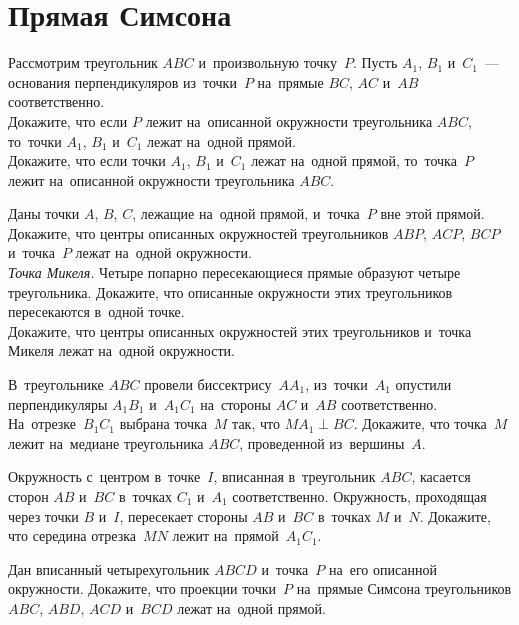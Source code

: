

\section*{Прямая Симсона}


\begin{problems}

\item
Рассмотрим треугольник $ABC$ и~произвольную точку~$P$.
Пусть $A_1$, $B_1$ и~$C_1$~--- основания перпендикуляров из~точки~$P$ на~прямые
$BC$, $AC$ и~$AB$ соответственно.
\\
\sbp
Докажите, что если $P$ лежит на~описанной окружности треугольника $ABC$,
то~точки $A_1$, $B_1$ и~$C_1$ лежат на~одной прямой.
\\
\sbp
Докажите, что если точки $A_1$, $B_1$ и~$C_1$ лежат на~одной прямой,
то~точка~$P$ лежит на~описанной окружности треугольника $ABC$.

\item
\sbp
Даны точки $A$, $B$, $C$, лежащие на~одной прямой, и~точка~$P$ вне этой прямой.
Докажите, что центры описанных окружностей треугольников $ABP$, $ACP$, $BCP$
и~точка~$P$ лежат на~одной окружности.
\\
\sbp\emph{Точка Микеля.}
Четыре попарно пересекающиеся прямые образуют четыре треугольника.
Докажите, что описанные окружности этих треугольников пересекаются в~одной
точке.
\\
\sbp
Докажите, что центры описанных окружностей этих треугольников и~точка Микеля
лежат на~одной окружности.

\item
В~треугольнике $ABC$ провели биссектрису~$A A_1$, из~точки~$A_1$ опустили
перпендикуляры $A_1 B_1$ и~$A_1 C_1$ на~стороны $AC$ и~$AB$ соответственно.
На~отрезке~$B_1 C_1$ выбрана точка~$M$ так, что $M A_1 \perp BC$.
Докажите, что точка~$M$ лежит на~медиане треугольника $ABC$, проведенной
из~вершины~$A$.

\item
Окружность с~центром в~точке~$I$, вписанная в~треугольник $ABC$, касается
сторон $AB$ и~$BC$ в~точках $C_1$ и~$A_1$ соответственно.
Окружность, проходящая через точки $B$ и~$I$, пересекает стороны $AB$ и~$BC$
в~точках $M$ и~$N$.
Докажите, что середина отрезка~$MN$ лежит на~прямой~$A_1 C_1$.

\item
Дан вписанный четырехугольник $ABCD$ и~точка~$P$ на~его описанной окружности.
Докажите, что проекции точки~$P$ на~прямые Симсона треугольников
$ABC$, $ABD$, $ACD$ и~$BCD$ лежат на~одной прямой.


\end{problems}
